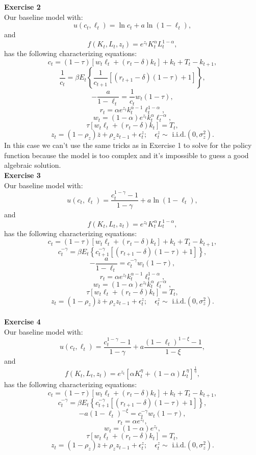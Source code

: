 \documentclass[letterpaper,12pt]{article}
\theoremstyle{definition}
\begin{document}
\noindent\textbf{Exercise 2}\\
Our baseline model with:
\[ u\left(c_{t}, \ell_{t}\right)=\ln c_{t}+a \ln \left(1-\ell_{t}\right), \]
and \[ f\left(K_{t}, L_{t}, z_{t}\right)=e^{z_{t}} K_{t}^{\alpha} L_{t}^{1-\alpha}, \]
has the following characterizing equations:
\[ c_{t}=(1-\tau)\left[w_{t} \ell_{t}+\left(r_{t}-\delta\right) k_{t}\right]+k_{t}+T_{t}-k_{t+1}, \]
\[ \frac{1}{c_t}=\beta E_{t}\left\{\frac{1}{c_{t+1}}\left[\left(r_{t+1}-\delta\right)(1-\tau)+1\right]\right\}, \]
\[ -\frac{a}{1-\ell_{t}}=\frac{1}{c_t} w_{t}(1-\tau), \]
\[ r_{t}=\alpha e^{z_{t}} k_{t}^{\alpha-1} \ell_{t}^{1-\alpha}, \]
\[ w_{t}=(1-\alpha)e^{z_{t}} k_{t}^{\alpha} \ell_{t}^{-\alpha}, \]
\[ \tau\left[w_{t} \ell_{t}+\left(r_{t}-\delta\right) k_{t}\right]=T_{t}, \]
\[ z_{t}=\left(1-\rho_{z}\right) \overline{z}+\rho_{z} z_{t-1}+\epsilon_{t}^{z} ; \quad \epsilon_{t}^{z} \sim \text { i.i.d.}\left(0, \sigma_{z}^{2}\right). \]
In this case we can't use the same tricks as in Exercise 1 to solve for the policy function because the model is too complex and it's impossible to guess a good algebraic solution.\\

\noindent\textbf{Exercise 3}\\
Our baseline model with:
\[ u\left(c_{t}, \ell_{t}\right)=\frac{c_{t}^{1-\gamma}-1}{1-\gamma}+a \ln \left(1-\ell_{t}\right), \]
and \[ f\left(K_{t}, L_{t}, z_{t}\right)=e^{z_{t}} K_{t}^{\alpha} L_{t}^{1-\alpha}, \]
has the following characterizing equations:
\[ c_{t}=(1-\tau)\left[w_{t} \ell_{t}+\left(r_{t}-\delta\right) k_{t}\right]+k_{t}+T_{t}-k_{t+1}, \]
\[ c_t^{-\gamma}=\beta E_{t}\left\{c_{t+1}^{-\gamma}\left[\left(r_{t+1}-\delta\right)(1-\tau)+1\right]\right\}, \]
\[ -\frac{a}{1-\ell_{t}}=c_t^{-\gamma} w_{t}(1-\tau), \]
\[ r_{t}=\alpha e^{z_{t}} k_{t}^{\alpha-1} \ell_{t}^{1-\alpha}, \]
\[ w_{t}=(1-\alpha)e^{z_{t}} k_{t}^{\alpha} \ell_{t}^{-\alpha}, \]
\[ \tau\left[w_{t} \ell_{t}+\left(r_{t}-\delta\right) k_{t}\right]=T_{t}, \]
\[ z_{t}=\left(1-\rho_{z}\right) \overline{z}+\rho_{z} z_{t-1}+\epsilon_{t}^{z} ; \quad \epsilon_{t}^{z} \sim \text { i.i.d.}\left(0, \sigma_{z}^{2}\right). \]\\

\noindent\textbf{Exercise 4}\\
Our baseline model with:
\[ u\left(c_{t}, \ell_{t}\right)=\frac{c_{t}^{1-\gamma}-1}{1-\gamma}+a \frac{\left(1-\ell_{t}\right)^{1-\xi}-1}{1-\xi}, \]
and \[ f\left(K_{t}, L_{t}, z_{t}\right)=e^{z_{t}}\left[\alpha K_{t}^{\eta}+(1-\alpha) L_{t}^{\eta}\right]^{\frac{1}{\eta}}, \]
has the following characterizing equations:
\[ c_{t}=(1-\tau)\left[w_{t} \ell_{t}+\left(r_{t}-\delta\right) k_{t}\right]+k_{t}+T_{t}-k_{t+1}, \]
\[ c_t^{-\gamma}=\beta E_{t}\left\{c_{t+1}^{-\gamma}\left[\left(r_{t+1}-\delta\right)(1-\tau)+1\right]\right\}, \]
\[ -a(1-\ell_{t})^{-\xi}=c_t^{-\gamma} w_{t}(1-\tau), \]
\[ r_{t}=\alpha e^{z_{t}}, \]
\[ w_{t}=(1-\alpha)e^{z_{t}}, \]
\[ \tau\left[w_{t} \ell_{t}+\left(r_{t}-\delta\right) k_{t}\right]=T_{t}, \]
\[ z_{t}=\left(1-\rho_{z}\right) \overline{z}+\rho_{z} z_{t-1}+\epsilon_{t}^{z} ; \quad \epsilon_{t}^{z} \sim \text { i.i.d.}\left(0, \sigma_{z}^{2}\right). \]\\
\end{document}
